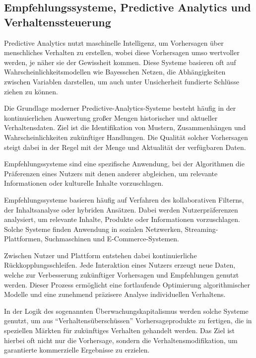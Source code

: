 \subsection{Empfehlungssysteme, Predictive Analytics und Verhaltenssteuerung}

Predictive Analytics nutzt maschinelle Intelligenz, um Vorhersagen über menschliches Verhalten zu erstellen, wobei diese Vorhersagen umso wertvoller werden, je näher sie der Gewissheit kommen. Diese Systeme basieren oft auf Wahrscheinlichkeitsmodellen wie Bayesschen Netzen, die Abhängigkeiten zwischen Variablen darstellen, um auch unter Unsicherheit fundierte Schlüsse ziehen zu können.

Die Grundlage moderner Predictive-Analytics-Systeme besteht häufig in der kontinuierlichen Auswertung großer Mengen historischer und aktueller Verhaltensdaten. Ziel ist die Identifikation von Mustern, Zusammenhängen und Wahrscheinlichkeiten zukünftiger Handlungen. Die Qualität solcher Vorhersagen steigt dabei in der Regel mit der Menge und Aktualität der verfügbaren Daten.

Empfehlungssysteme sind eine spezifische Anwendung, bei der Algorithmen die Präferenzen eines Nutzers mit denen anderer abgleichen, um relevante Informationen oder kulturelle Inhalte vorzuschlagen.

Empfehlungssysteme basieren häufig auf Verfahren des kollaborativen Filterns, der Inhaltsanalyse oder hybriden Ansätzen. Dabei werden Nutzerpräferenzen analysiert, um relevante Inhalte, Produkte oder Informationen vorzuschlagen. Solche Systeme finden Anwendung in sozialen Netzwerken, Streaming-Plattformen, Suchmaschinen und E-Commerce-Systemen.

Zwischen Nutzer und Plattform entstehen dabei kontinuierliche Rückkopplungsschleifen. Jede Interaktion eines Nutzers erzeugt neue Daten, welche zur Verbesserung zukünftiger Vorhersagen und Empfehlungen genutzt werden. Dieser Prozess ermöglicht eine fortlaufende Optimierung algorithmischer Modelle und eine zunehmend präzisere Analyse individuellen Verhaltens.

In der Logik des sogenannten Überwachungskapitalismus werden solche Systeme genutzt, um aus \enquote{Verhaltensüberschüssen} Vorhersageprodukte zu fertigen, die in speziellen Märkten für zukünftiges Verhalten gehandelt werden. Das Ziel ist hierbei oft nicht nur die Vorhersage, sondern die Verhaltensmodifikation, um garantierte kommerzielle Ergebnisse zu erzielen.

